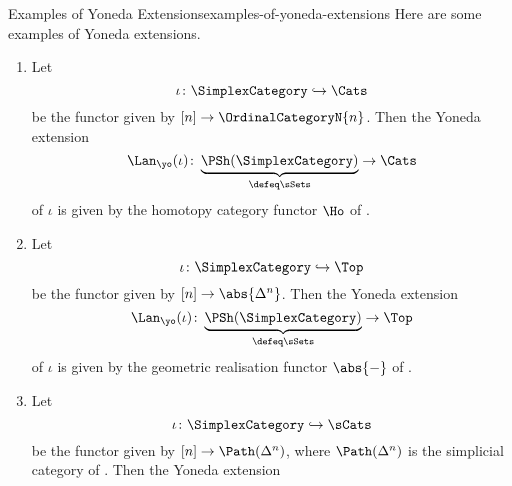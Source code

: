 \begin{example}{Examples of Yoneda Extensions}{examples-of-yoneda-extensions}%
    Here are some examples of Yoneda extensions.
    \begin{enumerate}
        \item\label{examples-of-yoneda-extensions-the-homotopy-category-functor}Let
            \[
                \iota%
                \colon%
                \SimplexCategory%
                \hookrightarrow%
                \Cats%
            \]%
            be the functor given by $[n]\to\OrdinalCategoryN{n}$. Then the Yoneda extension
            \[
                \Lan_{\yo}(\iota)%
                \colon%
                \underbrace{\PSh(\SimplexCategory)}_{\defeq\sSets}%
                \to%
                \Cats%
            \]%
            of $\iota$ is given by the homotopy category functor $\Ho$ of .
        \item\label{examples-of-yoneda-extensions-the-geometric-realisation-functor}Let
            \[
                \iota%
                \colon%
                \SimplexCategory%
                \hookrightarrow%
                \Top%
            \]%
            be the functor given by $[n]\to\abs{\Delta^{n}}$. Then the Yoneda extension
            \[
                \Lan_{\yo}(\iota)%
                \colon%
                \underbrace{\PSh(\SimplexCategory)}_{\defeq\sSets}%
                \to%
                \Top%
            \]%
            of $\iota$ is given by the geometric realisation functor $\abs{-}$ of .
        \item\label{examples-of-yoneda-extensions-the-path-simplicial-category-functor}Let
            \[
                \iota%
                \colon%
                \SimplexCategory%
                \hookrightarrow%
                \sCats%
            \]%
            be the functor given by $[n]\to\Path(\Delta^{n})$, where $\Path(\Delta^{n})$ is the simplicial category of . Then the Yoneda extension
            \[
\]
\end{enumerate}
\end{example}
